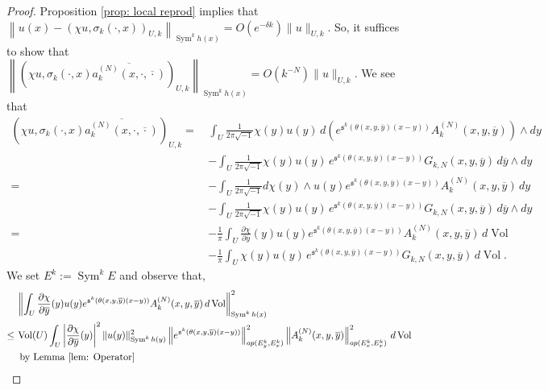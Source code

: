 \documentclass{amsart}
\theoremstyle{definition}
\theoremstyle{remark}
\numberwithin{equation}{section}
\newcommand{\deriv}[2]{\frac{\partial #1}{\partial #2}}
\DeclareMathOperator{\Sym}{Sym}
\DeclareMathOperator{\Vol}{Vol}
\begin{document}
\begin{proof}
Proposition \ref{prop: local reprod} implies that $\left \| u(x) - (\chi u,\sigma_k(\cdot,x))_{U,k} \right \|_{\Sym^k h(x)} = O(e^{-\delta k})\|u\|_{U,k}$. So, it suffices to show that $\left \|\left  (\chi u, \sigma_k(\cdot,x) \overline{ a^{(N)}_k(x,\cdot ,\overline{\cdot})} \right )_{U,k} \right \|_{\Sym^k h(x)} = O(k^{-N}) \|u\|_{U,k}$. We see that
\begin{align*}
{\left (\chi u, \sigma_k(\cdot,x) \overline{ a^{(N)}_k(x,\cdot ,\overline{\cdot})} \right )_{U,k}}
    = \hspace{2pt} & \int_{U} \frac{1}{2\pi \sqrt{-1}} \chi(y) u(y) \, d \left ( e^{\mathfrak{s}^k (\theta(x,y,\overline{y})(x-y))} A^{(N)}_k(x,y,\overline{y}) \right ) \wedge dy \\
    &  - \int_{U} \frac{1}{2\pi \sqrt{-1}}  \chi(y) u(y) \,  e^{\mathfrak{s}^k (\theta(x,y,\overline{y})(x-y))} G_{k,N}(x,y,\overline{y}) \,d\overline{y} \wedge dy \\
    = \hspace{2pt} &  - \int_U \frac{1}{2\pi \sqrt{-1}} d \chi(y) \wedge u(y) e^{\mathfrak{s}^k (\theta(x,y,\overline{y})(x-y))} A^{(N)}_k (x,y,\overline{y}) \, dy \\
    &  - \int_{U} \frac{1}{2\pi \sqrt{-1}} \chi(y) u(y) \,  e^{\mathfrak{s}^k (\theta(x,y,\overline{y})(x-y))} G_{k,N}(x,y,\overline{y}) \, d\overline{y} \wedge dy \\
    = \hspace{2pt} &  -\frac{1}{\pi} \int_U \deriv{\chi}{\overline{y}}(y) u(y) e^{\mathfrak{s}^k(\theta(x,y,\overline{y})(x-y))}A^{(N)}_k(x,y,\overline{y}) \,d\Vol \\
    & - \frac{1}{\pi} \int_{U} \chi(y) u(y) \,  e^{\mathfrak{s}^k (\theta(x,y,\overline{y})(x-y))} G_{k,N}(x,y,\overline{y}) \,d \Vol. 
\end{align*}
We set $E^k := \Sym^k E$ and observe that,
\begin{align*}
& \left \|  \int_U \deriv{\chi}{\overline{y}}(y) u(y) e^{\mathfrak{s}^k(\theta(x,y,\overline{y})(x-y))}A^{(N)}_k(x,y,\overline{y}) \,d\Vol \right \|_{\Sym^k h(x)}^2  \\
    \leq \hspace{2pt} & \Vol(U) \int_U \left |\deriv{\chi}{\overline{y}}(y) \right |^2 \| u(y) \|_{\Sym^k h(y)}^2  \left \| e^{\mathfrak{s}^k(\theta(x,y,\overline{y})(x-y))}\right\|_{op( E_y^k, E_x^k)}^2  \left \| A^{(N)}_k(x,y,\overline{y})\right \|_{op( E_x^k, E_x^k)}^2 \,d \Vol \\
    & \text{ by Lemma \ref{lem: Operator}} \\

\end{align*}
\end{proof}
\end{document}
